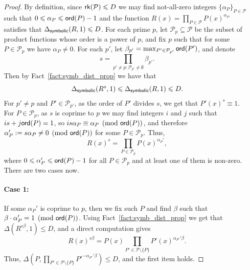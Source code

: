 \documentclass[10pt,a4paper]{amsart}
\renewcommand\leq{\leqslant}
\begin{document}
    \begin{proof}
        By definition, since ${\sf rk}(\mathcal{P})\leq D$ we may find not-all-zero integers $\{\alpha_P\}_{P\in\mathcal{P}}$ such that $0\leq \alpha_{P}\leq {\sf ord}(P)-1$ and the function $R(x) = \prod\limits_{P\in\mathcal{P}}P(x)^{\alpha_P}$ satisfies that $\Delta_{{\sf symbolic}}(R,1)\leq D$. For each prime $p$, let $\mathcal{P}_{p}\subseteq \mathcal{P}$ be the subset of product functions whose order is a power of $p$, and fix $p$ such that for some $P\in \mathcal{P}_{p}$ we have $\alpha_P\neq 0$. 
        For each $p'$, let $\beta_{p'} = \max_{P'\in\mathcal{P}_{p'}}{\sf ord}(P')$, and denote 
        \[
        s = \prod\limits_{p'\neq p: \mathcal{P}_{p'}\neq \emptyset} \beta_{p'}.
        \]
        Then by Fact~\ref{fact:symb_dist_prop} we have that
        \[
        \Delta_{{\sf symbolic}}(R^s,1)\leq 
        \Delta_{{\sf symbolic}}(R,1)
        \leq D.
        \]
        For $p'\neq p$ and $P'\in \mathcal{P}_{p'}$, as the order of $P'$ divides $s$, we get that $P'(x)^{s}\equiv 1$. For  $P\in \mathcal{P}_p$, as $s$ is coprime to $p$ we may find integers $i$ and $j$ such that $is + j{\sf ord}(P) = 1$, so
        $is\alpha_P \equiv \alpha_P\pmod{{\sf ord}(P)}$, and therefore $\alpha_P':=s\alpha_P\neq 0\pmod{{\sf ord}(P)}$ for some $P\in \mathcal{P}_{p}$.
        Thus,
        \[
        R(x)^s = 
        \prod\limits_{P\in\mathcal{P}_p}P(x)^{\alpha_P'},
        \]
        where $0\leq \alpha_{P}'\leq {\sf ord}(P)-1$ for all $P\in\mathcal{P}_p$ and at least one of them is non-zero.
        There are two cases now. 
        \vspace{-2ex}
        \paragraph{Case 1: } If some $\alpha_P'$ is coprime to $p$, then we fix such $P$ and find $\beta$ such that $\beta\cdot  \alpha_P' = 1\pmod{{\sf ord}(P)}$. Using Fact~\ref{fact:symb_dist_prop} we get that 
        $\Delta(R^{s\beta},1)\leq D$, and a direct computation gives 
        \[
        R(x)^{s\beta}
        = P(x)\prod\limits_{P'\in\mathcal{P}\setminus\{P\}} P'(x)^{\alpha_{P'}' \beta}.
        \]
        Thus, $\Delta(P,\prod\limits_{P'\in\mathcal{P}\setminus\{P\}} P'^{-\alpha_{P'}'\beta})\leq D$, and the first item holds. 
        \vspace{-2ex}

\end{proof}
\end{document}

